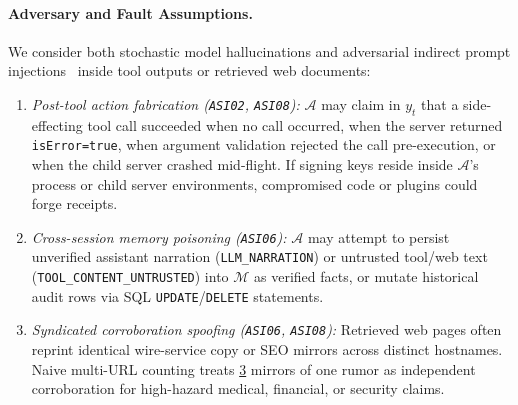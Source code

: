 \documentclass[10pt,twocolumn]{article}
\begin{document}
\paragraph{Adversary and Fault Assumptions.}
We consider both stochastic model hallucinations and adversarial indirect prompt injections~\cite{greshake2023indirect} inside tool outputs or retrieved web documents:
\begin{enumerate}
  \item \emph{Post-tool action fabrication (\texttt{ASI02}, \texttt{ASI08}):} $\mathcal{A}$ may claim in $y_t$ that a side-effecting tool call succeeded when no call occurred, when the server returned \texttt{isError=true}, when argument validation rejected the call pre-execution, or when the child server crashed mid-flight. If signing keys reside inside $\mathcal{A}$'s process or child server environments, compromised code or plugins could forge receipts.
  \item \emph{Cross-session memory poisoning (\texttt{ASI06}):} $\mathcal{A}$ may attempt to persist unverified assistant narration (\texttt{LLM\_NARRATION}) or untrusted tool/web text (\texttt{TOOL\_CONTENT\_UNTRUSTED}) into $\mathcal{M}$ as verified facts, or mutate historical audit rows via SQL \texttt{UPDATE}/\texttt{DELETE} statements.
  \item \emph{Syndicated corroboration spoofing (\texttt{ASI06}, \texttt{ASI08}):} Retrieved web pages often reprint identical wire-service copy or SEO mirrors across distinct hostnames. Naive multi-URL counting treats \href{https://github.com/AlienatedAliens/epistemic-guard/blob/v0.5.2/results/table2_conformance.json\#L70}{3} mirrors of one rumor as independent corroboration for high-hazard medical, financial, or security claims.
\end{enumerate}
\end{document}
